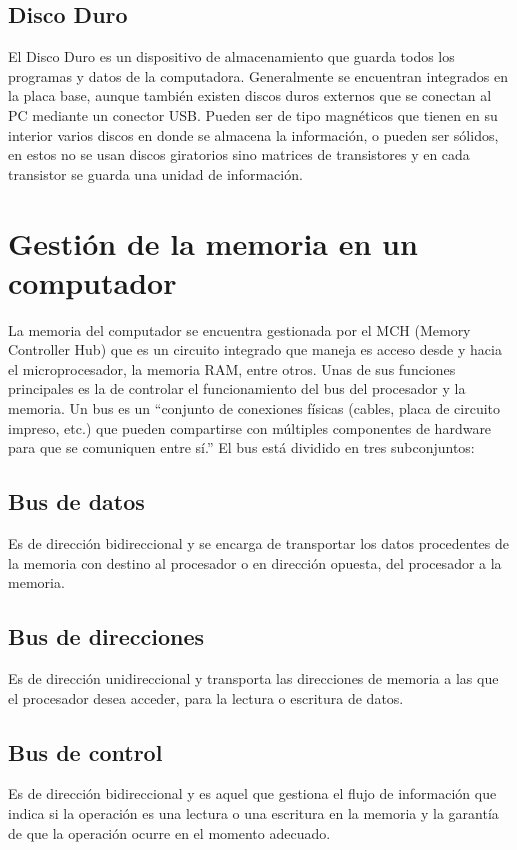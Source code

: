 \documentclass{article}
\begin{document}
\subsection{Disco Duro} 
El Disco Duro es un dispositivo de almacenamiento que guarda todos los programas y datos de la computadora.  Generalmente se encuentran integrados en la placa base, aunque también existen discos duros externos que se conectan al PC mediante un conector USB. Pueden ser de tipo magnéticos que tienen en su interior varios discos en donde se almacena la información, o pueden ser sólidos, en estos no se usan discos giratorios sino matrices de transistores y en cada transistor se guarda una unidad de información.


\section{Gestión de la memoria en un computador}
La memoria del computador se encuentra gestionada por el MCH (Memory Controller Hub)  que es un circuito integrado que maneja es acceso desde y hacia el microprocesador, la memoria RAM, entre otros. Unas de sus funciones principales es la de controlar el funcionamiento del bus del procesador y la memoria. Un bus es un ``conjunto de conexiones físicas (cables, placa de circuito impreso, etc.) que pueden compartirse con múltiples componentes de hardware para que se comuniquen entre sí.''\cite{bus} El bus está dividido en tres subconjuntos:


\subsection{Bus de datos}
Es de dirección bidireccional y se encarga de transportar los datos procedentes de la memoria con destino al procesador o en dirección opuesta, del procesador a la memoria.

\subsection{Bus de direcciones}
Es de dirección unidireccional y transporta las direcciones de memoria a las que el procesador desea acceder, para la lectura o escritura de datos.

\subsection{Bus de control}
Es de dirección bidireccional y es aquel que gestiona el flujo de información que indica si la operación es una lectura o una escritura en la memoria y la garantía de que la operación ocurre en el momento adecuado.
\end{document}
